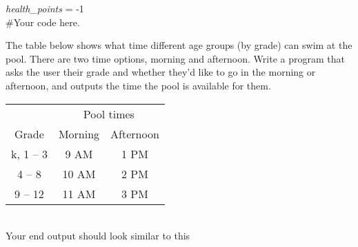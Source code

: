 		\vspace*{-6em}
		\textit{health\_points} = -1\\
		\#Your code here.
		\vspace*{3em}





	\item  
		The table below shows what time different age groups (by grade) can swim at the pool.  There 
		are two time options, morning and afternoon.  Write a program that asks the user their grade 
		and whether they'd like to go in the morning or afternoon, and outputs the time the pool is 
		available for them.

		\begin{minipage}{.45\textwidth}
		\begin{tabular}{c|cc}
						& \multicolumn{2}{c}{Pool times}\\
			Grade 		& Morning 	& Afternoon \\ \hline
			k, 1 -- 3 	& 9 AM 		& 1 PM\\
			4 -- 8 		& 10 AM 	& 2 PM\\
			9 -- 12 	& 11 AM 	& 3 PM \\
		\end{tabular}
		\end{minipage}
		\begin{minipage}{.45\textwidth}
			\ \\
			Your end output should look similar to this

		\end{minipage}











